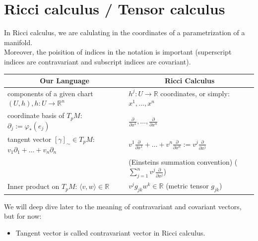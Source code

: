 \documentclass[11pt]{book} %
\begin{document}

\section{Ricci calculus / Tensor calculus}

In Ricci calculus, we are calulating in the coordinates of a parametrization of a manifold. \\
Moreover, the poisition of indices in the notation is important (superscript indices are contravariant and subscript indices are covariant). \\

\begin{center} 
\begin{tabular}{|m{}|m{}|}
    \hline
    \multicolumn{1}{|c|}{\textbf{Our Language}} & \multicolumn{1}{c|}{\textbf{Ricci Calculus}} \\ 
    \hline
    components of a given chart $(U, h), h : U \to \mathbb{R}^n$ 
    & $h^j : U \to \mathbb{R}$ coordinates, or simply: $x^1, \ldots, x^n$ 
    \\ 
    \hline
    coordinate basis of $T_pM$: $\partial_j := \varphi_*(e_j)$
    & $\frac{\partial}{\partial x^1}, \ldots, \frac{\partial}{\partial x^n}$ 
    \\
    \hline
    tangent vector $[\gamma]_{\sim} \in T_pM$: $v_1 \partial_1 + \ldots + v_n \partial_n$
    & $v^1 \frac{\partial}{\partial x^1} + \ldots + v^n \frac{\partial}{\partial x^n} := v^j \frac{\partial}{\partial x^j}$ \\ &
    (Einsteins summation convention) ($\sum_{j=1}^{n} v^j \frac{\partial}{\partial x^j}$)
    \\
    \hline
    Inner product on $T_pM$: $\langle v, w\rangle \in \mathbb{R}$
    & $v^j g_{jk} w^k \in \mathbb{R}$ (metric tensor $g_{jk}$)
    \\
    \hline
\end{tabular}
\end{center}

We will deep dive later to the meaning of contravariant and covariant vectors, but for now:
\begin{itemize}
    \item Tangent vector is called contravariant vector in Ricci calculus.
\end{itemize}
\end{document}
